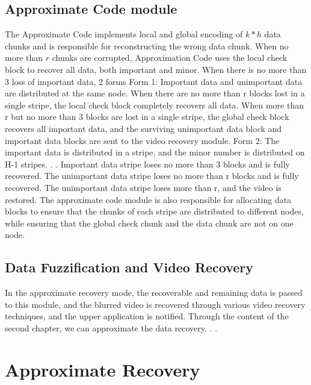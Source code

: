 \documentclass[sigconf]{acmart}
\begin{document}
\subsection{Approximate Code module}
The Approximate Code implements local and global encoding of $k*h$ data chunks and is responsible for reconstructing the wrong data chunk. When no more than $r$ chunks are corrupted, Approximation Code uses the local check block to recover all data, both important and minor. When there is no more than 3 loss of important data,
2 forms
Form 1: Important data and unimportant data are distributed at the same node.
When there are no more than r blocks lost in a single stripe, the local check block completely recovers all data.
When more than r but no more than 3 blocks are lost in a single stripe, the global check block recovers all important data, and the surviving unimportant data block and important data blocks are sent to the video recovery module.
Form 2: The important data is distributed in a stripe, and the minor number is distributed on H-1 stripes. . .
Important data stripe loses no more than 3 blocks and is fully recovered.
The unimportant data stripe loses no more than r blocks and is fully recovered.
The unimportant data stripe loses more than r, and the video is restored.
The approximate code module is also responsible for allocating data blocks to ensure that the chunks of each stripe are distributed to different nodes, while ensuring that the global check chunk and the data chunk are not on one node.

\subsection{Data Fuzzification and Video Recovery}
In the approximate recovery mode, the recoverable and remaining data is passed to this module, and the blurred video is recovered through various video recovery techniques, and the upper application is notified. Through the content of the second chapter, we can approximate the data recovery. . .

\section{Approximate Recovery}\label{ap-recovery}
\end{document}
